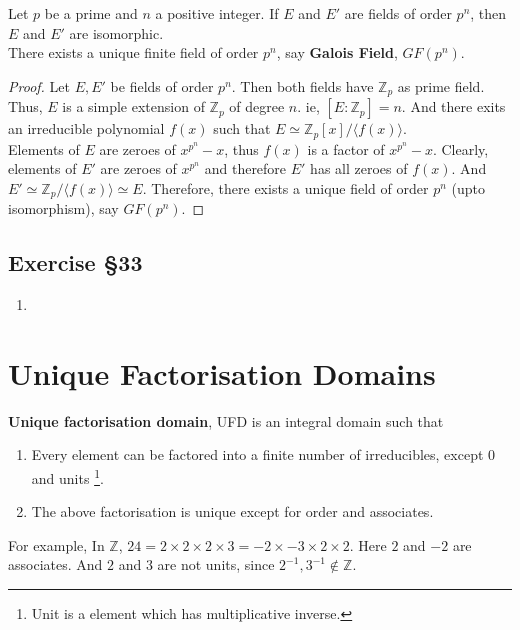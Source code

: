 \begin{theorem}
	Let $p$ be a prime and $n$ a positive integer.
	If $E$ and $E'$ are fields of order $p^n$, then $E$ and $E'$ are isomorphic.\\

	There exists a unique finite field of order $p^n$, say \textbf{Galois Field}, $GF(p^n)$.
\end{theorem}
\begin{proof}
	Let $E,E'$ be fields of order $p^n$.
	Then both fields have $\mathbb{Z}_p$ as prime field.
	Thus, $E$ is a simple extension of $\mathbb{Z}_p$ of degree $n$.
	ie, $[E:\mathbb{Z}_p] = n$.
	And there exits an irreducible polynomial $f(x)$ such that $E \simeq \mathbb{Z}_p[x]/\langle f(x) \rangle$. \\


	Elements of $E$ are zeroes of $x^{p^n}-x$, thus $f(x)$ is a factor of $x^{p^n}-x$.
	Clearly, elements of $E'$ are zeroes of $x^{p^n}$ and therefore $E'$ has all zeroes of $f(x)$.
	And $E' \simeq \mathbb{Z}_p/\langle f(x) \rangle \simeq E$.
	Therefore, there exists a unique field of order $p^n$ (upto isomorphism), say $GF(p^n)$.
\end{proof}

\subsection{Exercise \S33}
\begin{enumerate}
	\item
\end{enumerate}

\section{Unique Factorisation Domains}
\begin{definition}[UFD]
	\textbf{Unique factorisation domain}, UFD is an integral domain such that
	\begin{enumerate}
		\item Every element can be factored into a finite number of irreducibles, except 0 and units
		\dag\footnote{
			Unit is a element which has multiplicative inverse.}.
		\item The above factorisation is unique except for order and associates.
	\end{enumerate}
\end{definition}

For example, In $\mathbb{Z}$, $24 = 2 \times 2 \times 2 \times 3 = -2 \times -3 \times 2 \times 2$.
Here $2$ and $-2$ are associates.
And $2$ and $3$ are not units, since $2^{-1}, 3^{-1} \notin \mathbb{Z}$.

